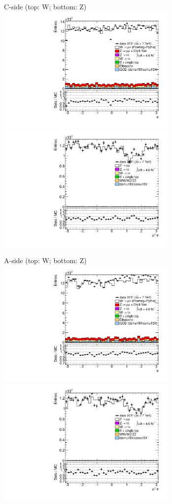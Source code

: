{

\colb[T]

C-side (top: W; bottom: Z)
\centering
\includegraphics[width=0.66\textwidth]{dates/20130306/figures/etaphi/W_8_C_stack_l_phi_POS} \\
\includegraphics[width=0.66\textwidth]{dates/20130306/figures/etaphi/Z_8_C_stack_lP_phi_ALL.pdf}

A-side (top: W; bottom: Z)
\centering
\includegraphics[width=0.66\textwidth]{dates/20130306/figures/etaphi/W_8_A_stack_l_phi_POS} \\
\includegraphics[width=0.66\textwidth]{dates/20130306/figures/etaphi/Z_8_A_stack_lP_phi_ALL.pdf} 

\cole
}


